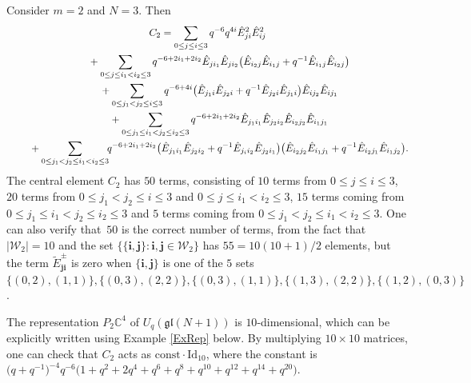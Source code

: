\documentclass[pdftex]{sigma}
\numberwithin{equation}{section}
\newcommand{\Uqgl}{{U_q(\mathfrak{gl}(N+1))}}
\newcommand{\ii}{{\mathbf{i}}}
\newcommand{\jj}{{\mathbf{j}}}
\begin{document}
\begin{Example}
Consider $m=2$ and $N=3$. Then
\begin{gather*}
C_2 = \sum_{0 \leq j \leq i \leq 3} q^{-6}q^{4i}\hat{E}_{ji}^2 \hat{E}_{ij}^2 \\
\hphantom{C_2 =}{}
+ \sum_{0\leq j \leq i_1 < i_2 \leq 3} q^{-6+2i_1+2i_2}\hat{E}_{ji_1}\hat{E}_{ji_2}\big(\hat{E}_{i_2j}\hat{E}_{i_1j} + q^{-1}\hat{E}_{i_1j}\hat{E}_{i_2j}\big) \\
\hphantom{C_2 =}{}+ \sum_{0\leq j_1 < j_2 \leq i \leq 3} q^{-6+4i}\big(\hat{E}_{j_1i}\hat{E}_{j_2i} + q^{-1}\hat{E}_{j_2i}\hat{E}_{j_1i} \big) \hat{E}_{ij_2}\hat{E}_{ij_1}\\
\hphantom{C_2 =}{}+ \sum_{0\leq j_1\leq i_1 < j_2 \leq i_2 \leq 3} q^{-6+2i_1+2i_2} \hat{E}_{j_1i_1}\hat{E}_{j_2i_2}\hat{E}_{i_2j_2}\hat{E}_{i_1j_1}\\
\hphantom{C_2 =}{}+\sum_{0\leq j_1 < j_2\leq i_1 < i_2 \leq 3}\!\! q^{-6+2i_1+2i_2} \big(\hat{E}_{j_1i_1}\hat{E}_{j_2i_2} + q^{-1}\hat{E}_{j_ii_2}\hat{E}_{j_2i_1} \big)\big(\hat{E}_{i_2j_2}\hat{E}_{i_1j_1} + q^{-1}\hat{E}_{i_2j_1}\hat{E}_{i_1j_2}\big).
\end{gather*}
The central element $C_2$ has $50$ terms, consisting of $10$ terms from $0\leq j \leq i \leq 3$, $20$ terms from $0 \leq j_1<j_2 \leq i \leq 3$ and $0\leq j\leq i_1<i_2 \leq 3$, $15$ terms coming from $0\leq j_1\leq i_1 < j_2 \leq i_2 \leq 3$ and $5$ terms coming from $0\leq j_1 < j_2\leq i_1 < i_2 \leq 3$. One can also verify that~$50$ is the correct number of terms, from the fact that $|\mathcal{W}_2|=10$ and the set $\{ \{\ii,\jj\}\colon \ii,\jj \in \mathcal{W}_2\}$ has $55=10(10+1)/2$ elements, but the term $\tilde{E}^{\pm}_{\jj\ii}$ is zero when $\{\ii,\jj\}$ is one of the $5$ sets $\{(0,2),(1,1)\},\{(0,3),(2,2)\},\{(0,3),(1,1)\},\{(1,3),(2,2)\},\{(1,2),(0,3)\}$.

The representation $P_2 \mathbb{C}^4$ of $\Uqgl$ is $10$-dimensional, which can be explicitly written using Example \ref{ExRep} below. By multiplying $10\times 10$ matrices, one can check that $C_2$ acts as $\text{const}\cdot \mathrm{Id}_{10}$, where the constant is $\big(q+q^{-1}\big)^{-4}q^{-6}\big(1+q^2+2q^4+q^6+q^8+q^{10}+q^{12}+q^{14}+q^{20}\big)$.
\end{Example}
\end{document}

